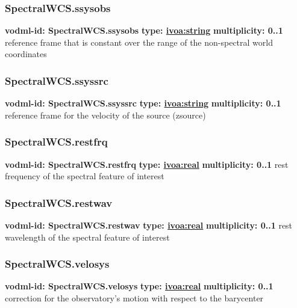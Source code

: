     \subsubsection{SpectralWCS.ssysobs}
      \textbf{vodml-id: SpectralWCS.ssysobs} \newline
      \textbf{type: \hyperref[sect:ivoa]{ivoa:string}} \newline
      \textbf{multiplicity: 0..1} \newline
      reference frame that is constant over the range of the non-spectral world coordinates

    \subsubsection{SpectralWCS.ssyssrc}
      \textbf{vodml-id: SpectralWCS.ssyssrc} \newline
      \textbf{type: \hyperref[sect:ivoa]{ivoa:string}} \newline
      \textbf{multiplicity: 0..1} \newline
      reference frame for the velocity of the source (zsource)

    \subsubsection{SpectralWCS.restfrq}
      \textbf{vodml-id: SpectralWCS.restfrq} \newline
      \textbf{type: \hyperref[sect:ivoa]{ivoa:real}} \newline
      \textbf{multiplicity: 0..1} \newline
      rest frequency of the spectral feature of interest

    \subsubsection{SpectralWCS.restwav}
      \textbf{vodml-id: SpectralWCS.restwav} \newline
      \textbf{type: \hyperref[sect:ivoa]{ivoa:real}} \newline
      \textbf{multiplicity: 0..1} \newline
      rest wavelength of the spectral feature of interest

    \subsubsection{SpectralWCS.velosys}
      \textbf{vodml-id: SpectralWCS.velosys} \newline
      \textbf{type: \hyperref[sect:ivoa]{ivoa:real}} \newline
      \textbf{multiplicity: 0..1} \newline
      correction for the observatory's motion with respect to the barycenter

